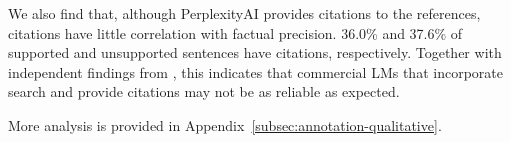 \noindent
We also find that, although PerplexityAI provides citations to the references, citations have little correlation with factual precision. 36.0\% and 37.6\% of supported and unsupported sentences have citations, respectively. %
Together with independent findings from \citet{liu2023evaluating}, %
this indicates that commercial LMs that incorporate search and provide citations may not be as reliable as expected.

\vspace{.2em}
More analysis is provided in Appendix~\ref{subsec:annotation-qualitative}.